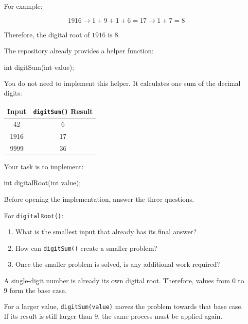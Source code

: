 \documentclass{csc2059practical}
\begin{document}
For example:

\[
1916
\rightarrow
1+9+1+6
=
17
\rightarrow
1+7
=
8
\]

Therefore, the digital root of \(1916\) is \(8\).

The repository already provides a helper function:

\begin{cppcode}
int digitSum(int value);
\end{cppcode}

You do not need to implement this helper. It calculates one sum of the decimal
digits:

\begin{center}
\begin{tabular}{cc}
\toprule
\textbf{Input} & \textbf{\texttt{digitSum()} Result} \\
\midrule
42 & 6 \\
1916 & 17 \\
9999 & 36 \\
\bottomrule
\end{tabular}
\end{center}

Your task is to implement:

\begin{cppcode}
int digitalRoot(int value);
\end{cppcode}

Before opening the implementation, answer the three questions.

\begin{engineeringquestion}
For \texttt{digitalRoot()}:

\begin{enumerate}
    \item What is the smallest input that already has its final answer?
    \item How can \texttt{digitSum()} create a smaller problem?
    \item Once the smaller problem is solved, is any additional work required?
\end{enumerate}
\end{engineeringquestion}

A single-digit number is already its own digital root. Therefore, values from
\(0\) to \(9\) form the base case.

For a larger value, \texttt{digitSum(value)} moves the problem towards
that base case. If its result is still larger than \(9\), the same process must
be applied again.
\end{document}
